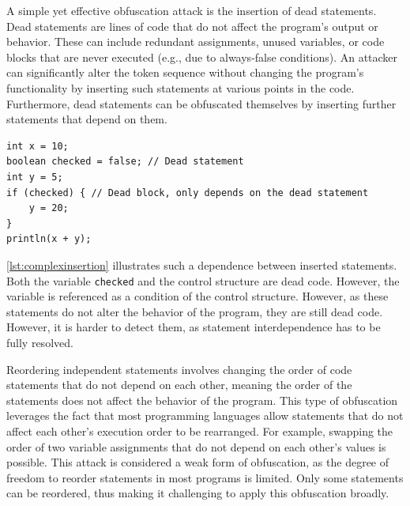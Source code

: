 A simple yet effective obfuscation attack is the insertion of dead statements. Dead statements are lines of code that do not affect the program's output or behavior. These can include redundant assignments, unused variables, or code blocks that are never executed (e.g., due to always-false conditions). An attacker can significantly alter the token sequence without changing the program's functionality by inserting such statements at various points in the code. Furthermore, dead statements can be obfuscated themselves by inserting further statements that depend on them.

\begin{samepage}
\begin{lstlisting}[caption={Example for Obfuscated Dead Statements},label=lst:complexinsertion]
int x = 10;
boolean checked = false; // Dead statement
int y = 5;
if (checked) { // Dead block, only depends on the dead statement
    y = 20;
}
println(x + y);
\end{lstlisting}
\end{samepage}

\autoref{lst:complexinsertion} illustrates such a dependence between inserted statements. Both the variable \texttt{checked} and the control structure are dead code. However, the variable is referenced as a condition of the control structure.
However, as these statements do not alter the behavior of the program, they are still dead code. However, it is harder to detect them, as statement interdependence has to be fully resolved.

Reordering independent statements involves changing the order of code statements that do not depend on each other, meaning the order of the statements does not affect the behavior of the program. This type of obfuscation leverages the fact that most programming languages allow statements that do not affect each other's execution order to be rearranged. For example, swapping the order of two variable assignments that do not depend on each other's values is possible. This attack is considered a weak form of obfuscation, as the degree of freedom to reorder statements in most programs is limited. Only some statements can be reordered, thus making it challenging to apply this obfuscation broadly.

